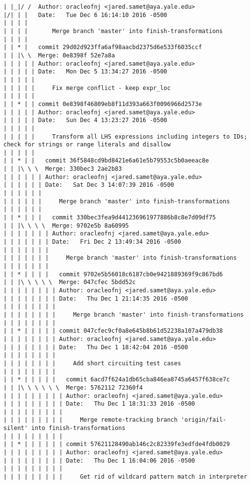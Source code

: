 \begin{lstlisting}
| |_|/ /  Author: oracleofnj <jared.samet@aya.yale.edu>
|/| | |   Date:   Tue Dec 6 16:14:10 2016 -0500
| | | |   
| | | |       Merge branch 'master' into finish-transformations
| | | |       
| | * |   commit 29d02d923ffa6af98aacbd2375d6e533f6035ccf
| | |\ \  Merge: 0e8398f 52e7a8a
| | | | | Author: oracleofnj <jared.samet@aya.yale.edu>
| | | | | Date:   Mon Dec 5 13:34:27 2016 -0500
| | | | | 
| | | | |     Fix merge conflict - keep expr_loc
| | | | |      
| | * | | commit 0e8398f46809eb8f11d393a663f0096966d2573e
| | | | | Author: oracleofnj <jared.samet@aya.yale.edu>
| | | | | Date:   Sun Dec 4 13:23:27 2016 -0500
| | | | | 
| | | | |     Transform all LHS expressions including integers to IDs; check for strings or range literals and disallow
| | | | |        
| | * | |   commit 36f5848cd9bd8421e6a61e5b79553c5b0aeeac8e
| | |\ \ \  Merge: 330bec3 2ae2b83
| | | | | | Author: oracleofnj <jared.samet@aya.yale.edu>
| | | | | | Date:   Sat Dec 3 14:07:39 2016 -0500
| | | | | | 
| | | | | |     Merge branch 'master' into finish-transformations
| | | | | |         
| | * | | |   commit 330bec3fea9d441236961977886b8c8e7d09df75
| | |\ \ \ \  Merge: 9702e5b 8a60995
| | | | | | | Author: oracleofnj <jared.samet@aya.yale.edu>
| | | | | | | Date:   Fri Dec 2 13:49:34 2016 -0500
| | | | | | | 
| | | | | | |     Merge branch 'master' into finish-transformations
| | | | | | |          
| | * | | | |   commit 9702e5b56018c6187cb0e9421889369f9c867bd6
| | |\ \ \ \ \  Merge: 047cfec 5bdd52c
| | | | | | | | Author: oracleofnj <jared.samet@aya.yale.edu>
| | | | | | | | Date:   Thu Dec 1 21:14:35 2016 -0500
| | | | | | | | 
| | | | | | | |     Merge branch 'master' into finish-transformations
| | | | | | | |         
| | * | | | | | commit 047cfec9cf0a8e645b8b61d52238a107a479db38
| | | | | | | | Author: oracleofnj <jared.samet@aya.yale.edu>
| | | | | | | | Date:   Thu Dec 1 18:42:04 2016 -0500
| | | | | | | | 
| | | | | | | |     Add short circuiting test cases
| | | | | | | |           
| | * | | | | |   commit 6acd7f624a1db65cba846ea8745a6457f638ce7c
| | |\ \ \ \ \ \  Merge: 5762112 72360f4
| | | | | | | | | Author: oracleofnj <jared.samet@aya.yale.edu>
| | | | | | | | | Date:   Thu Dec 1 18:31:33 2016 -0500
| | | | | | | | | 
| | | | | | | | |     Merge remote-tracking branch 'origin/fail-silent' into finish-transformations
| | | | | | | | |          
| | * | | | | | | commit 57621128490ab146c2c82339fe3edfde4fdb0029
| | | | | | | | | Author: oracleofnj <jared.samet@aya.yale.edu>
| | | | | | | | | Date:   Thu Dec 1 16:04:06 2016 -0500
| | | | | | | | | 
| | | | | | | | |     Get rid of wildcard pattern match in interpreter

\end{lstlisting}
